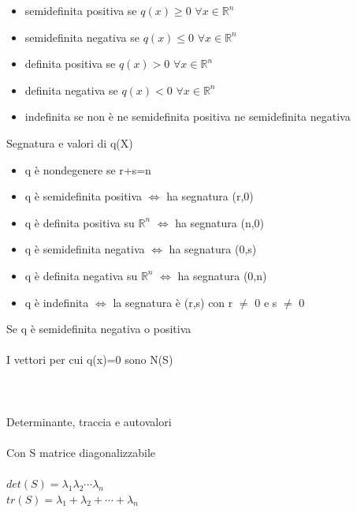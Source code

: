 \documentclass{article}
\begin{document}
\begin{itemize}
    \item semidefinita positiva se \(q(x)\ge 0\)  \(\forall x\in \mathbb{R}^n\)
    \item semidefinita negativa se \(q(x)\le 0\)  \(\forall x\in \mathbb{R}^n\)
    \item definita positiva se \(q(x)> 0\)  \(\forall x\in \mathbb{R}^n\)
    \item definita negativa se \(q(x)< 0\)  \(\forall x\in \mathbb{R}^n\)
    \item indefinita se non è ne semidefinita positiva ne semidefinita negativa
\end{itemize}
{\large Segnatura e valori di q(X)}
\begin{itemize}
	\item q è nondegenere se r+s=n
    \item q è semidefinita positiva \(\iff\) ha segnatura (r,0)
    \item q è definita positiva su \(\mathbb{R}^n\) \(\iff\) ha segnatura (n,0)
    \item q è semidefinita negativa \(\iff\) ha segnatura (0,s)
    \item q è definita negativa su \(\mathbb{R}^n\) \(\iff\) ha segnatura (0,n)
    \item q è indefinita \(\iff\) la segnatura è (r,s) con r \(\ne\) 0 e s \(\ne\) 0  
\end{itemize}
Se q è semidefinita negativa o positiva\\\\
I vettori per cui q(x)=0 sono N(S)\\\\\\\\

{\large Determinante, traccia e autovalori}\\\\
Con S matrice diagonalizzabile\\\\
\(det(S)= \lambda_1\lambda_2\cdots\lambda_n\)\\
\(tr(S)= \lambda_1+\lambda_2+\cdots+\lambda_n\)\\\\
\end{document}
